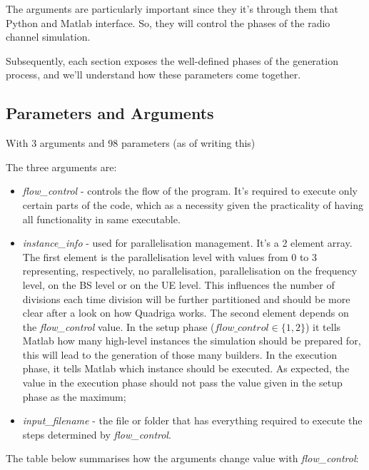 The arguments are particularly important since they it's through them that Python and Matlab interface. So, they will control the phases of the radio channel simulation.

Subsequently, each section exposes the well-defined phases of the generation process, and we'll understand how these parameters come together.

\subsection{Parameters and Arguments}

With 3 arguments and 98 parameters (as of writing this)

The three arguments are:

\begin{itemize}
    \item \textit{flow\_control} - controls the flow of the program. It's required to execute only certain parts of the code, which as a necessity given the practicality of having all functionality in same executable. 
    \item \textit{instance\_info} - used for parallelisation management. It's a 2 element array. The first element is the parallelisation level with values from 0 to 3 representing, respectively, no parallelisation, parallelisation on the frequency level, on the \acl{BS} level or on the UE level. This influences the number of divisions each time division will be further partitioned and should be more clear after a look on how Quadriga works. The second element depends on the \textit{flow\_control} value. In the setup phase ($flow\_control \in \{1, 2\}$) it tells Matlab how many high-level instances the simulation should be prepared for, this will lead to the generation of those many builders. In the execution phase, it tells Matlab which instance should be executed. As expected, the value in the execution phase should not pass the value given in the setup phase as the maximum;
    \item \textit{input\_filename} - the file or folder that has everything required to execute the steps determined by \textit{flow\_control}.
\end{itemize}

The table below summarises how the arguments change value with \textit{flow\_control}:







